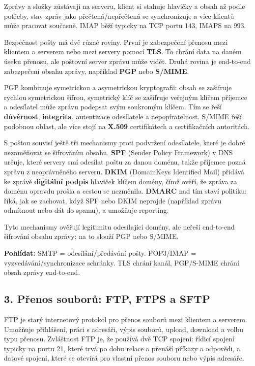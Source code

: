 \documentclass[11pt,a4paper]{article}
\newcommand{\itbox}[1]{\medskip\noindent\colorbox{black!6}{\parbox{\dimexpr\linewidth-2\fboxsep}{#1}}\medskip}
\begin{document}
Zprávy a složky zůstávají na serveru, klient si stahuje hlavičky a obsah až podle potřeby, stav zpráv jako přečtená/nepřečtená se synchronizuje a více klientů může pracovat současně. IMAP běží typicky na TCP portu 143, IMAPS na 993.

Bezpečnost pošty má dvě různé roviny. První je zabezpečení přenosu mezi klientem a serverem nebo mezi servery pomocí \textbf{TLS}. To chrání data na daném úseku přenosu, ale poštovní server zprávu může vidět. Druhá rovina je end-to-end zabezpečení obsahu zprávy, například \textbf{PGP} nebo \textbf{S/MIME}.

PGP kombinuje symetrickou a asymetrickou kryptografii: obsah se zašifruje rychlou symetrickou šifrou, symetrický klíč se zašifruje veřejným klíčem příjemce a odesílatel může zprávu podepsat svým soukromým klíčem. Tím se řeší \textbf{důvěrnost}, \textbf{integrita}, autentizace odesílatele a nepopíratelnost. S/MIME řeší podobnou oblast, ale více stojí na \textbf{X.509} certifikátech a certifikačních autoritách.

S poštou souvisí ještě tři mechanismy proti podvržení odesílatele, které je dobré nezaměňovat se šifrováním obsahu. \textbf{SPF} (Sender Policy Framework) v DNS určuje, které servery smí odesílat poštu za danou doménu, takže příjemce pozná zprávu z neoprávněného serveru. \textbf{DKIM} (DomainKeys Identified Mail) přidává ke zprávě \textbf{digitální podpis} hlaviček klíčem domény, čímž ověří, že zpráva za doménu opravdu prošla a cestou se nezměnila. \textbf{DMARC} nad tím staví politiku: říká, jak se zachovat, když SPF nebo DKIM neprojde (například zprávu odmítnout nebo dát do spamu), a umožňuje reporting.

Tyto mechanismy ověřují legitimitu odesílající domény, ale neřeší end-to-end šifrování obsahu zprávy; na to slouží PGP nebo S/MIME.

\itbox{\textbf{Pohlídat:} SMTP = odesílání/předávání pošty. POP3/IMAP = vyzvedávání/synchronizace schránky. TLS chrání kanál, PGP/S-MIME chrání obsah zprávy end-to-end.}

\subsection*{3. Přenos souborů: FTP, FTPS a SFTP}

FTP je starý internetový protokol pro přenos souborů mezi klientem a serverem. Umožňuje přihlášení, práci s adresáři, výpis souborů, upload, download a volbu typu přenosu. Zvláštnost FTP je, že používá dvě TCP spojení: řídicí spojení typicky na portu 21, které trvá po dobu relace a přenáší příkazy a odpovědi, a datové spojení, které se otevírá pro vlastní přenos souboru nebo výpis adresáře.
\end{document}
